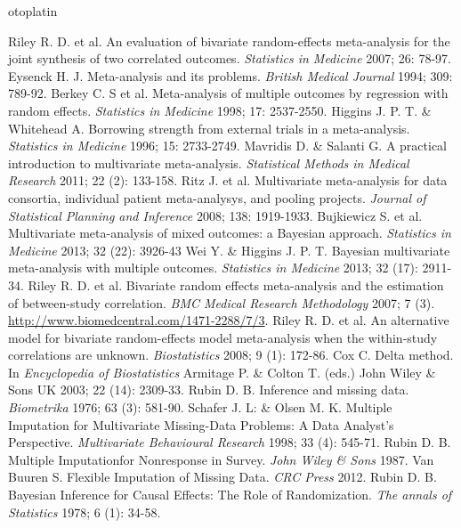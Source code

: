 otoplatin\documentclass[a4paper,openright,12pt]{report}
\begin{document}
\begin{thebibliography}{99}
 Riley R. D. et al. An evaluation of bivariate random-effects meta-analysis for the joint synthesis of two correlated outcomes. \textit{Statistics in Medicine} 2007; 26: 78-97.
 Eysenck H. J. Meta-analysis and its problems. \textit{British Medical Journal} 1994; 309: 789-92.
 Berkey C. S et al. Meta-analysis of multiple outcomes by regression with random effects. \textit{Statistics in Medicine} 1998; 17: 2537-2550. 
 Higgins J. P. T. \& Whitehead A. Borrowing strength from external trials in a meta-analysis. \textit{Statistics in Medicine} 1996; 15: 2733-2749.
 Mavridis D. \& Salanti G. A practical introduction to multivariate meta-analysis. \textit{Statistical Methods in Medical Research} 2011; 22 (2): 133-158.
 Ritz J. et al. Multivariate meta-analysis for data consortia, individual patient meta-analysys, and pooling projects. \textit{Journal of Statistical Planning and Inference} 2008; 138: 1919-1933.
 Bujkiewicz S. et al. Multivariate meta-analysis of mixed outcomes: a Bayesian approach. \textit{Statistics in Medicine} 2013; 32 (22): 3926-43
 Wei Y. \& Higgins J. P. T. Bayesian multivariate meta-analysis with multiple outcomes. \textit{Statistics in Medicine} 2013; 32 (17): 2911-34.
 Riley R. D. et al. Bivariate random effects meta-analysis and the estimation of between-study correlation. \textit{BMC Medical Research Methodology} 2007; 7 (3). \url{http://www.biomedcentral.com/1471-2288/7/3}.
 Riley R. D. et al. An alternative model for bivariate random-effects model meta-analysis when the within-study correlations are unknown. \textit{Biostatistics} 2008; 9 (1): 172-86. 
 Cox C. Delta method. In \textit{Encyclopedia of Biostatistics} Armitage P. \& Colton T. (eds.) John Wiley \& Sons UK 2003; 22 (14): 2309-33.
 Rubin D. B. Inference and missing data. \textit{Biometrika} 1976; 63 (3): 581-90.
 Schafer J. L: \& Olsen M. K. Multiple Imputation for Multivariate Missing-Data Problems: A Data Analyst's Perspective. \textit{Multivariate Behavioural Research} 1998; 33 (4): 545-71. 
 Rubin D. B. Multiple Imputationfor Nonresponse in Survey. \textit{John Wiley \& Sons} 1987.
 Van Buuren S. Flexible Imputation of Missing Data. \textit{CRC Press} 2012.
 Rubin D. B. Bayesian Inference for Causal Effects: The Role of Randomization. \textit{The annals of Statistics} 1978; 6 (1): 34-58.

\end{thebibliography}
\end{document}
